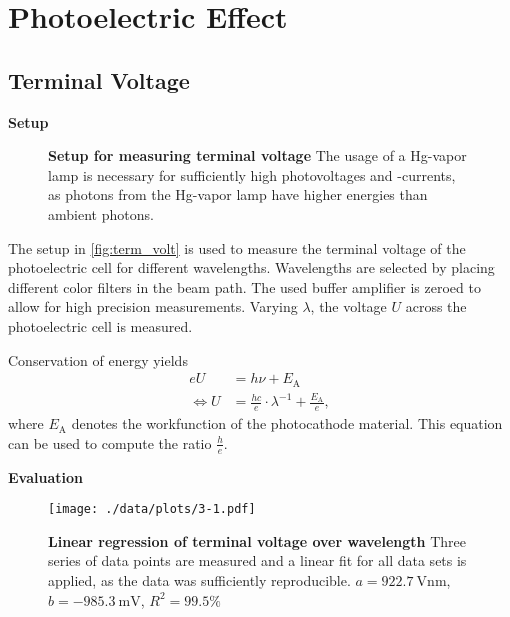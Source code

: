 \chapter{Photoelectric Effect}


\section{Terminal Voltage}\label{sec:term_volt}%

\textbf{Setup}\\
\begin{figure}[tbp]
	\centering
	\caption[Setup for measuring terminal voltage]{\textbf{Setup for measuring terminal voltage} The usage of a Hg-vapor lamp is necessary for sufficiently high photovoltages and -currents, as photons from the Hg-vapor lamp have higher energies than ambient photons.}
	\label{fig:term_volt}
\end{figure}
The setup in \autoref{fig:term_volt} is used to measure the terminal voltage of the photoelectric cell for different wavelengths.
Wavelengths are selected by placing different color filters in the beam path.
The used buffer amplifier is zeroed to allow for high precision measurements.
Varying $\lambda$, the voltage $U$ across the photoelectric cell is measured.

Conservation of energy yields
\begin{align}
	eU &= h\nu+E_\text{A} \nonumber \\
	\Leftrightarrow U &= \frac{hc}{e}\cdot\lambda^{-1}+\frac{E_\text{A}}{e}, \label{eq:energy_balance}
\end{align}
where $E_\text{A}$ denotes the workfunction of the photocathode material.
This equation can be used to compute the ratio $\frac{h}{e}$.

\textbf{Evaluation}\\
\begin{figure}[tbp]
	\centering
	\texttt{[image: ./data/plots/3-1.pdf]}
	\caption[Linear regression of terminal voltage over wavelength]{\textbf{Linear regression of terminal voltage over wavelength} Three series of data points are measured and a linear fit for all data sets is applied, as the data was sufficiently reproducible. $a=\SI{922.7}{\volt\nm}$, $b=\SI{-985.3}{\milli\V}$, $R^2=99.5\%$}
	\label{fig:linreg_term_volt}
\end{figure}


